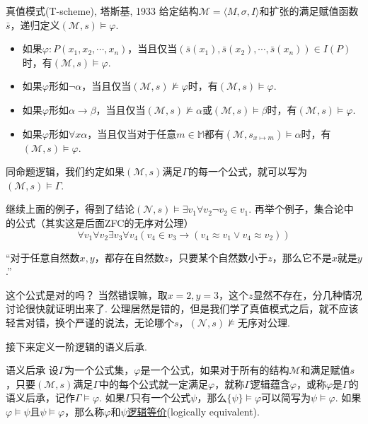 \documentclass[main.tex]{subfiles}
\begin{document}
\begin{definition}{真值模式(T-scheme), 塔斯基, 1933}
    给定结构\(\mathcal{M} = \langle M,\sigma, I \rangle\)和扩张的满足赋值函数\(\bar{s}\)，递归定义\((\mathcal{M}, s) \vDash \varphi\).
    \begin{itemize}
        \item 如果\(\varphi: P(x_1,x_2,\cdots,x_n)\)，当且仅当\((\bar s(x_1), \bar s(x_2), \cdots, \bar s(x_n)) \in I(P)\)时，有\((\mathcal{M}, s) \vDash \varphi\).
        \item 如果\(\varphi\)形如\(\neg \alpha\)，当且仅当\((\mathcal{M}, s) \not \vDash \varphi\)时，有\((\mathcal{M}, s) \vDash \varphi\).
        \item 如果\(\varphi\)形如\(\alpha \to \beta\)，当且仅当\((\mathcal{M}, s) \not \vDash \alpha\)或\((\mathcal{M}, s) \vDash \beta\)时，有\((\mathcal{M}, s) \vDash \varphi\).
        \item 如果\(\varphi\)形如\(\forall x \alpha\)，当且仅当对于任意\(m \in \mathbb{M}\)都有\((\mathcal{M}, s_{x \mapsto m}) \vDash \alpha\)时，有\((\mathcal{M}, s) \vDash \varphi\).
    \end{itemize}
\end{definition}

\begin{reference}
    同命题逻辑，我们约定如果\((\mathcal{M}, s)\)满足\(\Gamma\)的每一个公式，就可以写为\((\mathcal{M}, s) \vDash \Gamma\).
\end{reference}

继续上面的例子，得到了结论\((\mathcal{N},s) \vDash \exists v_1 \forall v_2 \neg v_2 \in v_1\). 再举个例子，集合论中的公式（其实这是后面\textsf{ZFC}的无序对公理）
\[\forall v_1 \forall v_2 \exists v_3 \forall v_4(v_4 \in v_3 \to (v_4 \approx v_1 \vee v_4 \approx v_2))\]
\begin{center}
    “对于任意自然数\(x,y\)，都存在自然数\(z\)，只要某个自然数小于\(z\)，那么它不是\(x\)就是\(y\).”
\end{center}
这个公式是对的吗？ 当然错误嘛，取\(x=2,y=3\)，这个\(z\)显然不存在，分几种情况讨论很快就证明出来了. 公理居然是错的，但是我们学了真值模式之后，就不应该轻言对错，换个严谨的说法，无论哪个\(s\)，\((\mathcal{N},s) \not \vDash \mbox{无序对公理}\). 

接下来定义一阶逻辑的语义后承.

\begin{definition}{语义后承}
    设\(\Gamma\)为一个公式集，\(\varphi\)是一个公式，如果对于所有的结构\(\mathcal{M}\)和满足赋值\(s\)，只要\((\mathcal{M}, s)\)满足\(\Gamma\)中的每个公式就一定满足\(\varphi\)，就称\(\Gamma\)逻辑蕴含\(\varphi\)，或称\(\varphi\)是\(\Gamma\)的语义后承，记作\(\Gamma \vDash \varphi\). \newline
    如果\(\Gamma\)只有一个公式\(\psi\)，那么\(\{\psi\} \vDash \varphi\)可以简写为\(\psi \vDash \varphi\). 如果\(\varphi \vDash \psi\)且\(\psi \vDash \varphi\)，那么称\(\varphi\)和\(\psi\)\uline{逻辑等价}(logically equivalent).
\end{definition}
\end{document}
